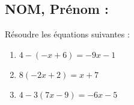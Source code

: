 \documentclass[a4paper,11pt,exos]{nsi} %
\begin{document}
\subsection*{NOM, Prénom : \dotfill} 


\maketitle




\begin{exercice}
Résoudre les équations suivantes :
\begin{multicols}{3}
	\begin{enumerate}
		
		\item $4-(-x+6)=-9x-1$
		\item $8(-2x+2)=x+7$
		\item $4-3(7x-9)=-6x-5$
	\end{enumerate}
\end{multicols}

\end{exercice}

\end{document}
